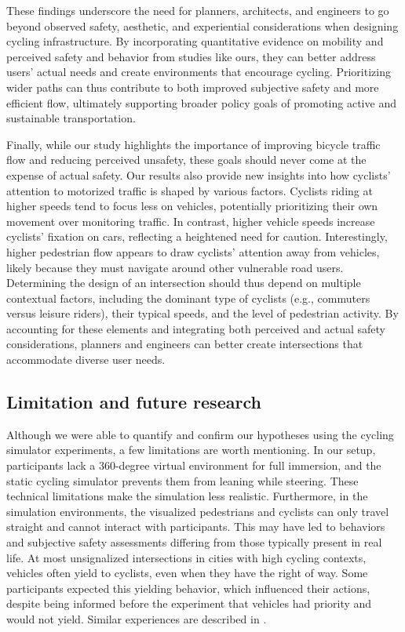 \documentclass[3p,authoryear]{elsarticle}
\begin{document}
These findings underscore the need for planners, architects, and engineers to go
beyond observed safety, aesthetic, and experiential considerations when designing
cycling infrastructure. By incorporating quantitative evidence on mobility and
perceived safety and behavior from studies like ours, they can better address
users' actual needs and create environments that encourage cycling. Prioritizing
wider paths can thus contribute to both improved subjective safety and more
efficient flow, ultimately supporting broader policy goals of promoting active
and sustainable transportation.

Finally, while our study highlights the importance of improving bicycle traffic
flow and reducing perceived unsafety, these goals should never come at the
expense of actual safety. Our results also provide new insights into how
cyclists' attention to motorized traffic is shaped by various factors. Cyclists
riding at higher speeds tend to focus less on vehicles, potentially prioritizing
their own movement over monitoring traffic. In contrast, higher vehicle speeds
increase cyclists' fixation on cars, reflecting a heightened need for caution.
Interestingly, higher pedestrian flow appears to draw cyclists' attention away
from vehicles, likely because they must navigate around other vulnerable road
users. Determining the design of an intersection should thus depend on multiple
contextual factors, including the dominant type of cyclists (e.g., commuters
versus leisure riders), their typical speeds, and the level of pedestrian
activity. By accounting for these elements and integrating both perceived and
actual safety considerations, planners and engineers can better create
intersections that accommodate diverse user needs.

\subsection{Limitation and future research}
Although we were able to quantify and confirm our hypotheses using the cycling
simulator experiments, a few limitations are worth mentioning. In our setup,
participants lack a 360-degree virtual environment for full immersion, and the
static cycling simulator prevents them from leaning while steering. These
technical limitations make the simulation less realistic. Furthermore, in the
simulation environments, the visualized pedestrians and cyclists can only travel
straight and cannot interact with participants. This may have led to behaviors
and subjective safety assessments differing from those typically present in real
life. At most unsignalized intersections in cities with high cycling contexts,
vehicles often yield to cyclists, even when they have the right of way. Some
participants expected this yielding behavior, which influenced their actions,
despite being informed before the experiment that vehicles had priority and would
not yield. Similar experiences are described in \citet*{berghoefer2023prefer}.
\end{document}
